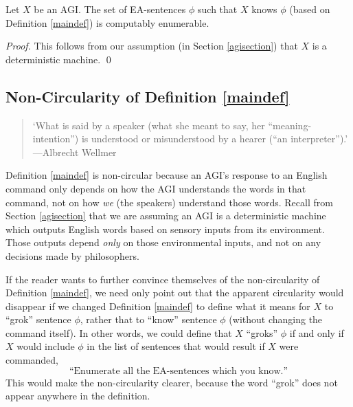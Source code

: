 \documentclass[runningheads]{llncs}
\begin{document}
\begin{theorem}
\label{retheorem}
  Let $X$ be an AGI.
  The set of EA-sentences $\phi$ such that $X$ knows $\phi$ (based on
  Definition \ref{maindef}) is computably enumerable.
\end{theorem}

\begin{proof}
  This follows from our assumption (in Section \ref{agisection}) that
  $X$ is a deterministic machine.
  \qed
\end{proof}


\subsection{Non-Circularity of Definition \ref{maindef}}
\label{noncircularsubsection}

\begin{quote}
  `What is said by a speaker (what she meant to say, her ``meaning-intention'')
  is understood or misunderstood by a
  hearer (``an interpreter'').'
  ---Albrecht Wellmer \cite{wellmer2014skepticism}
\end{quote}

Definition \ref{maindef} is non-circular because an AGI's response to an English
command only depends on how the AGI understands the words in that command, not
on how \emph{we} (the speakers) understand those words.
Recall from Section \ref{agisection}
that we are assuming an AGI is a deterministic machine which outputs English words
based on sensory inputs from its environment. Those outputs depend \emph{only} on those
environmental inputs, and not on any decisions made by philosophers.

If the reader wants to further convince themselves of the non-circularity of Definition
\ref{maindef}, we need only point out that the apparent circularity would disappear if
we changed Definition \ref{maindef} to define what it means for $X$ to ``grok'' sentence
$\phi$, rather that to ``know'' sentence $\phi$ (without changing the command itself).
In other words, we could define that $X$ ``groks'' $\phi$ if and only if $X$ would include
$\phi$ in the list of sentences that would result if $X$ were commanded,
  \[
  \text{``Enumerate all the EA-sentences which you know.''}
  \]
This would make the non-circularity clearer, because the word ``grok'' does not appear
anywhere in the definition.
\end{document}
